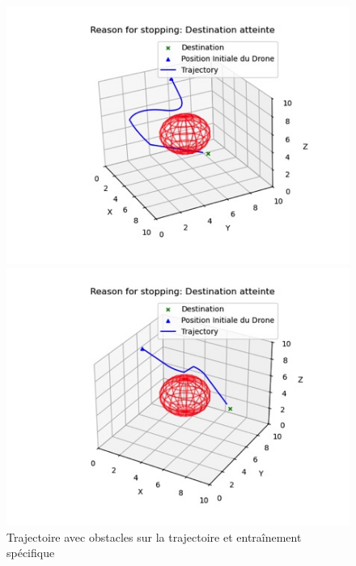 \documentclass[a4paper, 12pt]{article}
\begin{document}
\begin{figure}[H]
    \centering
    \begin{minipage}{0.49\textwidth}
        \centering
        \includegraphics[width=\textwidth]{att.D1KL_7bUX90t0ksXRxzEPxHcgLQs8o7jh7mdn5SYMgo.png}
    \end{minipage}
    \hfill
    \begin{minipage}{0.49\textwidth}
        \centering
        \includegraphics[width=\textwidth]{traj_evite.png}
    \end{minipage}
    \caption{Trajectoire avec obstacles sur la trajectoire et entraînement spécifique}
\end{figure}
\end{document}
